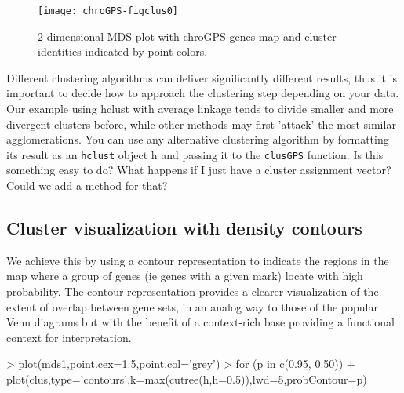 \documentclass[a4paper,12pt,nogin]{article}
\newcommand{\newtext}[1]{{\color{blue} #1}} %
\newcommand{\drcomment}[1]{{\color{red} #1}} %
\begin{document}
\normalsize
 
\begin{figure}
\begin{center}
\texttt{[image: chroGPS-figclus0]}
\end{center}
\caption{2-dimensional MDS plot with chroGPS-genes map and cluster
  identities indicated by point colors. }
\label{fig:clus0}
\end{figure}
 
Different clustering algorithms can deliver
significantly different results, thus it is important to decide how to
approach the clustering step depending on your data. Our example using hclust with average
linkage tends to divide smaller and more divergent clusters before,
while other methods may first 'attack' the most similar agglomerations.
You can use any 
\newtext{alternative clustering algorithm by formatting}
its result as an \texttt{hclust} object h \newtext{and passing it} to the \texttt{clusGPS}
function.
\drcomment{Is this something easy to do? What happens if I just have a cluster assignment vector? Could we add a method for that?}
 
\subsection{Cluster visualization with density contours}
\label{sec:clusGPS3}
 
We achieve this by using a contour representation to indicate the regions
in the map where a group of genes (ie genes with a given mark) locate
with high probability. The contour representation provides a clearer
visualization of the extent of overlap between gene sets, in an analog
way to those of the popular Venn diagrams but with the benefit of a
context-rich base providing a functional context for
interpretation.

\footnotesize
\begin{Schunk}
\begin{Sinput}
> plot(mds1,point.cex=1.5,point.col='grey')
> for (p in c(0.95, 0.50))
+ plot(clus,type='contours',k=max(cutree(h,h=0.5)),lwd=5,probContour=p)
\end{Sinput}
\end{Schunk}
\normalsize
\end{document}

